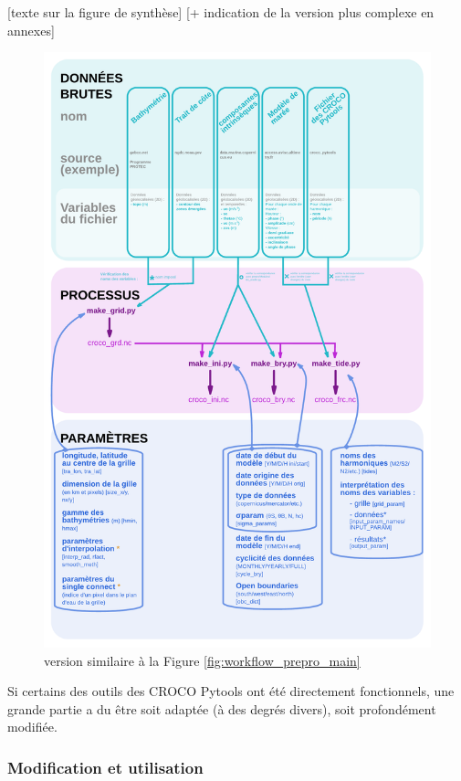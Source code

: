 \documentclass[10pt,a4paper,titlepage]{article}
\begin{document}
\alert{[texte sur la figure de synthèse]
    [+ indication de la version plus complexe en annexes]}
\begin{figure}[H]
    \centering
    \includegraphics[scale=0.5]{../images/workflow/graphe_prepro_mere_original.pdf}
    \caption{
        version similaire à la Figure \ref{fig:workflow_prepro_main}
    }
    \label{fig:workflow_prepro_original}
\end{figure}

Si certains des outils des CROCO Pytools ont été directement fonctionnels, une grande partie a du être soit adaptée (à des degrés divers), soit profondément modifiée.

\subsubsection{Modification et utilisation}
\end{document}
